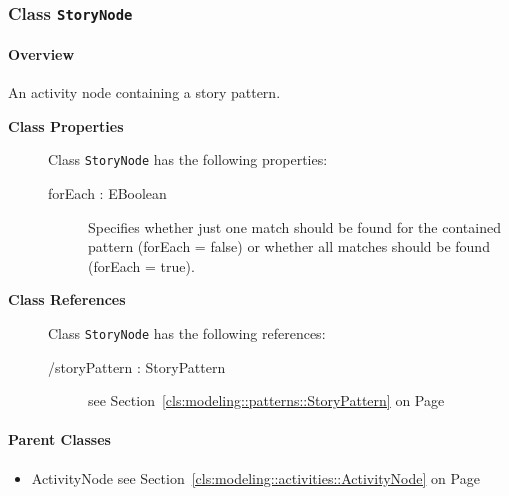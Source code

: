 \subsubsection{\Large{Class \bfseries \texttt{StoryNode}\normalfont}}
\label{cls:modeling::activities::StoryNode} 
\paragraph{Overview}

	
			
An activity node containing a story pattern.	
		
	


\begin{description}

	\item[\textbf{Class Properties}] Class \texttt{StoryNode} has the following properties:
	\begin{description}
\item[forEach : EBoolean 	]

\hspace{\fill}
\nopagebreak


	
			
Specifies whether just one match should be found for the contained pattern (forEach  = false) or whether all matches should be found (forEach = true).	
		
	
	\end{description}
	
	\item[\textbf{Class References}] Class \texttt{StoryNode} has the following references:
	\begin{description}
\item[/storyPattern : StoryPattern 	]
see Section~\ref{cls:modeling::patterns::StoryPattern} on Page~\pageref{cls:modeling::patterns::StoryPattern}
\hspace{\fill}
\nopagebreak


	
			
	
		
	
	\end{description}
	

\end{description}

\paragraph{Parent Classes}
\begin{itemize}
\item ActivityNode see Section~\ref{cls:modeling::activities::ActivityNode} on Page~\pageref{cls:modeling::activities::ActivityNode}\end{itemize}
